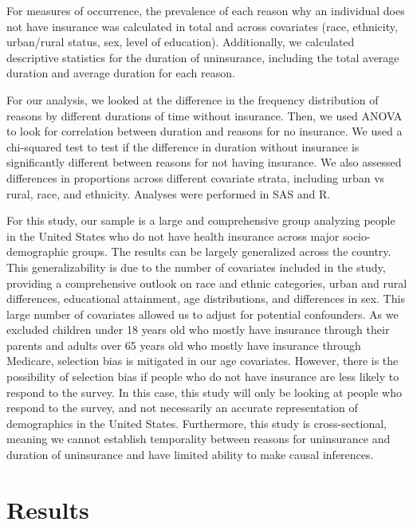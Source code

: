 \documentclass[12pt]{article}
\begin{document}
For measures of occurrence, the prevalence of each reason why an individual does not have insurance was calculated in total and across covariates (race, ethnicity, urban/rural status, sex, level of education). Additionally, we calculated descriptive statistics for the duration of uninsurance, including the total average duration and average duration for each reason. 

For our analysis, we looked at the difference in the frequency distribution of reasons by different durations of time without insurance. Then, we used ANOVA to look for correlation between duration and reasons for no insurance. We used a chi-squared test to test if the difference in duration without insurance is significantly different between reasons for not having insurance. We also assessed differences in proportions across different covariate strata, including urban vs rural, race, and ethnicity. Analyses were performed in SAS and R.

For this study, our sample is a large and comprehensive group analyzing people in the United States who do not have health insurance across major socio-demographic groups. The results can be largely generalized across the country. This generalizability is due to the number of covariates included in the study, providing a comprehensive outlook on race and ethnic categories, urban and rural differences, educational attainment, age distributions, and differences in sex. This large number of covariates allowed us to adjust for potential confounders. As we excluded children under 18 years old who mostly have insurance through their parents and adults over 65 years old who mostly have insurance through Medicare, selection bias is mitigated in our age covariates. However, there is the possibility of selection bias if people who do not have insurance are less likely to respond to the survey. In this case, this study will only be looking at people who respond to the survey, and not necessarily an accurate representation of demographics in the United States. Furthermore, this study is cross-sectional, meaning we cannot establish temporality between reasons for uninsurance and duration of uninsurance and have limited ability to make causal inferences.



\newpage
\section{Results}
\end{document}
